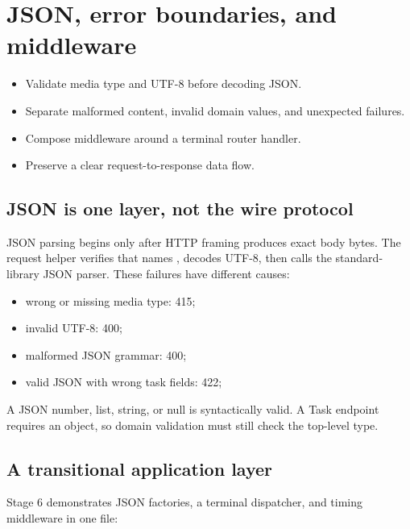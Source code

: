\chapter{JSON, error boundaries, and middleware}

\begin{objectives}
\begin{itemize}
  \item Validate media type and UTF-8 before decoding JSON.
  \item Separate malformed content, invalid domain values, and unexpected failures.
  \item Compose middleware around a terminal router handler.
  \item Preserve a clear request-to-response data flow.
\end{itemize}
\end{objectives}

\section{JSON is one layer, not the wire protocol}

JSON parsing begins only after HTTP framing produces exact body bytes. The request
helper verifies that  names , decodes
UTF-8, then calls the standard-library JSON parser. These failures have different
causes:

\begin{itemize}
  \item wrong or missing media type: 415;
  \item invalid UTF-8: 400;
  \item malformed JSON grammar: 400;
  \item valid JSON with wrong task fields: 422;
\end{itemize}

A JSON number, list, string, or null is syntactically valid. A Task endpoint
requires an object, so domain validation must still check the top-level type.

\section{A transitional application layer}

Stage 6 demonstrates JSON factories, a terminal dispatcher, and timing middleware
in one file:

